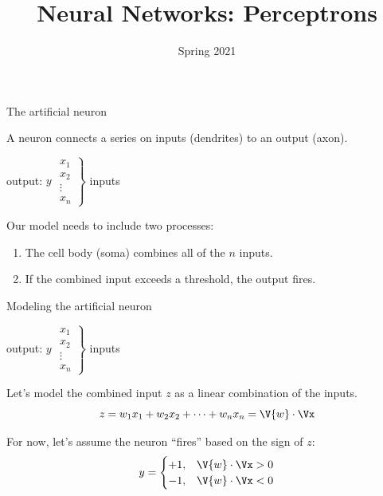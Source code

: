 \documentclass[9pt]{beamer}
\title{Neural Networks: Perceptrons}
\date{Spring 2021}
\begin{document}
\maketitle

\begin{frame}{The artificial neuron}

A neuron connects a series on inputs (dendrites) to an output (axon).

\begin{center}
	output: $y$
	$\left. \begin{matrix}x_1\\x_2\\ \vdots\\ x_n\end{matrix} \right\rbrace$ inputs
\end{center}
\pause
Our model needs to include two processes:
\begin{enumerate}
	\item The cell body (soma) combines all of the $n$ inputs.
	\item If the combined input exceeds a threshold, the output fires.
\end{enumerate}

\end{frame}

\begin{frame}{Modeling the artificial neuron}

\begin{center}
	output: $y$
	$\left. \begin{matrix}x_1\\x_2\\ \vdots\\ x_n\end{matrix} \right\rbrace$ inputs
\end{center}
\bigskip
Let's model the combined input $z$ as a linear combination of the inputs.
\[ z = w_1x_1 + w_2x_2 + \cdots + w_nx_n = \V{w}\cdot\Vx \]

\pause
\bigskip
For now, let's assume the neuron ``fires'' based on the sign of $z$:
\[ y = \begin{cases} +1, & \V{w}\cdot\Vx > 0 \\ -1, & \V{w}\cdot\Vx < 0 \end{cases} \]

\end{frame}
\end{document}
